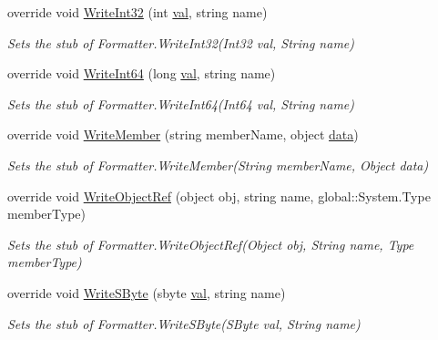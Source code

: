 \begin{DoxyCompactItemize}
override void \hyperlink{class_system_1_1_runtime_1_1_serialization_1_1_fakes_1_1_stub_formatter_aaf136e93eb8559e1a0a2864f018e6195}{Write\-Int32} (int \hyperlink{jquery-1_810_82-vsdoc_8js_a0888cacd53defa08fbb4972d54ece4b0}{val}, string name)
\begin{DoxyCompactList}\small\item\em Sets the stub of Formatter.\-Write\-Int32(\-Int32 val, String name)\end{DoxyCompactList}\item 
override void \hyperlink{class_system_1_1_runtime_1_1_serialization_1_1_fakes_1_1_stub_formatter_a95289d41ece048d9d73794ed4ddeddff}{Write\-Int64} (long \hyperlink{jquery-1_810_82-vsdoc_8js_a0888cacd53defa08fbb4972d54ece4b0}{val}, string name)
\begin{DoxyCompactList}\small\item\em Sets the stub of Formatter.\-Write\-Int64(\-Int64 val, String name)\end{DoxyCompactList}\item 
override void \hyperlink{class_system_1_1_runtime_1_1_serialization_1_1_fakes_1_1_stub_formatter_a626c3beb2584818823a81dab6e7456e1}{Write\-Member} (string member\-Name, object \hyperlink{jquery-1_810_82-vsdoc_8js_a609407b3456fdc3c5671a9fc4a226ff7}{data})
\begin{DoxyCompactList}\small\item\em Sets the stub of Formatter.\-Write\-Member(\-String member\-Name, Object data)\end{DoxyCompactList}\item 
override void \hyperlink{class_system_1_1_runtime_1_1_serialization_1_1_fakes_1_1_stub_formatter_a44a7343bc7169e45bc9756bc6eb64ceb}{Write\-Object\-Ref} (object obj, string name, global\-::\-System.\-Type member\-Type)
\begin{DoxyCompactList}\small\item\em Sets the stub of Formatter.\-Write\-Object\-Ref(\-Object obj, String name, Type member\-Type)\end{DoxyCompactList}\item 
override void \hyperlink{class_system_1_1_runtime_1_1_serialization_1_1_fakes_1_1_stub_formatter_a5bca204225e7f0810cd24d1a639c0d4c}{Write\-S\-Byte} (sbyte \hyperlink{jquery-1_810_82-vsdoc_8js_a0888cacd53defa08fbb4972d54ece4b0}{val}, string name)
\begin{DoxyCompactList}\small\item\em Sets the stub of Formatter.\-Write\-S\-Byte(\-S\-Byte val, String name)\end{DoxyCompactList}\item 

\end{DoxyCompactItemize}

